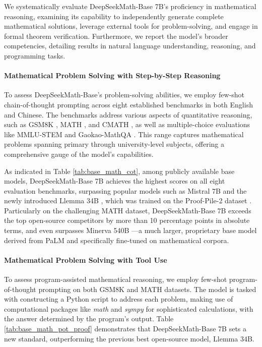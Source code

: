 \begin{itemize}[topsep=0pt]
We systematically evaluate DeepSeekMath-Base 7B’s proficiency in mathematical reasoning, examining its capability to independently generate complete mathematical solutions, leverage external tools for problem-solving, and engage in formal theorem verification. Furthermore, we report the model's broader competencies, detailing results in natural language understanding, reasoning, and programming tasks.

\paragraph{Mathematical Problem Solving with Step-by-Step Reasoning}

To assess DeepSeekMath-Base’s problem-solving abilities, we employ few-shot chain-of-thought prompting \citep{cot} across eight established benchmarks in both English and Chinese. The benchmarks address various aspects of quantitative reasoning, such as GSM8K \citep{gsm8k}, MATH \citep{MATH}, and CMATH \citep{wei2023cmath}, as well as multiple-choice evaluations like MMLU-STEM \citep{mmlu} and Gaokao-MathQA \citep{agieval}. This range captures mathematical problems spanning primary through university-level subjects, offering a comprehensive gauge of the model's capabilities.

As indicated in Table \ref{tab:base_math_cot}, among publicly available base models, DeepSeekMath-Base 7B achieves the highest scores on all eight evaluation benchmarks, surpassing popular models such as Mistral 7B \citep{mistral} and the newly introduced Llemma 34B \citep{llemma}, which was trained on the Proof-Pile-2 dataset \citep{llemma}. Particularly on the challenging MATH dataset, DeepSeekMath-Base 7B exceeds the top open-source competitors by more than 10 percentage points in absolute terms, and even surpasses Minerva 540B \citep{minerva}—a much larger, proprietary base model derived from PaLM \citep{palm} and specifically fine-tuned on mathematical corpora.

\paragraph{Mathematical Problem Solving with Tool Use} To assess program-assisted mathematical reasoning, we employ few-shot program-of-thought prompting \citep{pot,pal} on both GSM8K and MATH datasets. The model is tasked with constructing a Python script to address each problem, making use of computational packages like \textit{math} and \textit{sympy} for sophisticated calculations, with the answer determined by the program’s output. Table \ref{tab:base_math_pot_proof} demonstrates that DeepSeekMath-Base 7B sets a new standard, outperforming the previous best open-source model, Llemma 34B.


\end{itemize}
